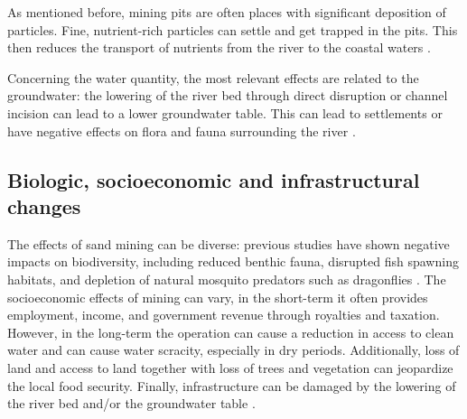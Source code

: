 As mentioned before, mining pits are often places with significant deposition of particles. Fine, nutrient-rich particles can settle and get trapped in the pits. This then reduces the transport of nutrients from the river to the coastal waters \autocite{sand-mining-boek}.

Concerning the water quantity, the most relevant effects are related to the groundwater: the lowering of the river bed through direct disruption or channel incision can lead to a lower groundwater table. This can lead to settlements or have negative effects on flora and fauna surrounding the river \autocite{rentierEnvironmentalImpactsRiver2022}.

\subsection{Biologic, socioeconomic and infrastructural changes}
The effects of sand mining can be diverse: previous studies have shown negative impacts on biodiversity, including reduced benthic fauna, disrupted fish spawning habitats, and depletion of natural mosquito predators such as dragonflies \autocite{sand-mining-boek}. The socioeconomic effects of mining can vary, in the short-term it often provides employment, income, and government revenue through royalties and taxation. However, in the long-term the operation can cause a reduction in access to clean water and can cause water scracity, especially in dry periods. Additionally, loss of land and access to land together with loss of trees and vegetation can jeopardize the local food security. Finally, infrastructure can be damaged by the lowering of the river bed and/or the groundwater table \autocite{sand-mining-boek}.